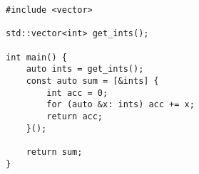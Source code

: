 \begin{lstlisting}[title=\href{https://godbolt.org/z/B9UDnG}{\texttt{godbolt.org/z/B9UDnG}}]
#include <vector>

std::vector<int> get_ints();

int main() {
    auto ints = get_ints();
    const auto sum = [&ints] {
        int acc = 0;
        for (auto &x: ints) acc += x;
        return acc;
    }();

    return sum;
}
\end{lstlisting}

